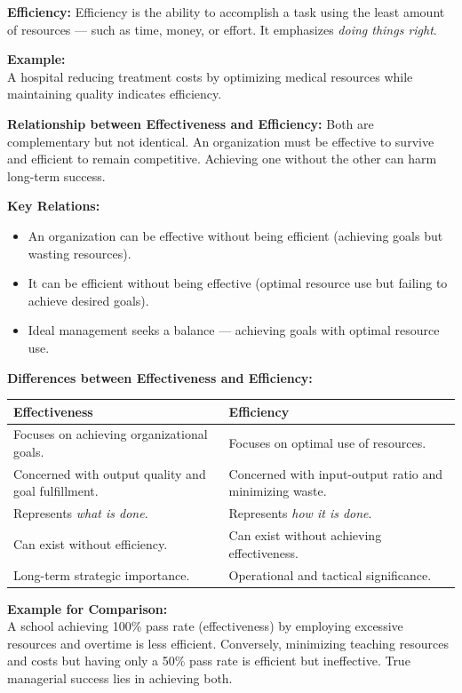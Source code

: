 \documentclass[10pt,a4paper]{book}
\begin{document}
\textbf{Efficiency:}
Efficiency is the ability to accomplish a task using the least amount of resources — such as time, money, or effort. It emphasizes \textit{doing things right}.

\textbf{Example:}\\
A hospital reducing treatment costs by optimizing medical resources while maintaining quality indicates efficiency.

\textbf{Relationship between Effectiveness and Efficiency:}
Both are complementary but not identical. An organization must be effective to survive and efficient to remain competitive. Achieving one without the other can harm long-term success.

\textbf{Key Relations:}
\begin{itemize}
    \item An organization can be effective without being efficient (achieving goals but wasting resources).
    \item It can be efficient without being effective (optimal resource use but failing to achieve desired goals).
    \item Ideal management seeks a balance — achieving goals with optimal resource use.
\end{itemize}

\textbf{Differences between Effectiveness and Efficiency:}

\begin{tabular}{|p{8cm}|p{8cm}|}
\hline
\textbf{Effectiveness} & \textbf{Efficiency} \\
\hline
Focuses on achieving organizational goals. & Focuses on optimal use of resources. \\
\hline
Concerned with output quality and goal fulfillment. & Concerned with input-output ratio and minimizing waste. \\
\hline
Represents \textit{what is done}. & Represents \textit{how it is done}. \\
\hline
Can exist without efficiency. & Can exist without achieving effectiveness. \\
\hline
Long-term strategic importance. & Operational and tactical significance. \\
\hline
\end{tabular}

\vspace{0.5cm}

\textbf{Example for Comparison:}\\
A school achieving 100\% pass rate (effectiveness) by employing excessive resources and overtime is less efficient. Conversely, minimizing teaching resources and costs but having only a 50\% pass rate is efficient but ineffective. True managerial success lies in achieving both.
\end{document}
